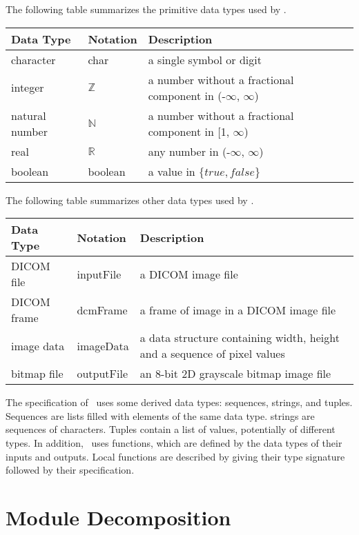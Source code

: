 \documentclass[12pt, titlepage]{article}
\begin{document}
The following table summarizes the primitive data types used by \progname. 

\begin{center}
\renewcommand{\arraystretch}{1.2}
\noindent 
\begin{tabular}{l l p{7.5cm}} 
\toprule 
\textbf{Data Type} & \textbf{Notation} & \textbf{Description}\\ 
\midrule
character & char & a single symbol or digit\\
integer & $\mathbb{Z}$ & a number without a fractional component in (-$\infty$,
$\infty$) \\
natural number & $\mathbb{N}$ & a number without a fractional component in [1,
$\infty$) \\
real & $\mathbb{R}$ & any number in (-$\infty$, $\infty$)\\
boolean & boolean & a value in $\{true, false\}$\\
\bottomrule
\end{tabular} 
\end{center}

The following table summarizes other data types used by \progname.
\begin{center}
\renewcommand{\arraystretch}{1.2}
\noindent 
\begin{tabular}{l l p{7.5cm}} 
\toprule 
\textbf{Data Type} & \textbf{Notation} & \textbf{Description}\\ 
\midrule
DICOM file & inputFile & a DICOM image file\\
DICOM frame & dcmFrame & a frame of image in a DICOM image file\\
image data & imageData & a data structure containing width, height and a
sequence of pixel values\\
bitmap file & outputFile & an 8-bit 2D grayscale bitmap image file\\
\bottomrule
\end{tabular} 
\end{center}

\noindent
The specification of \progname \ uses some derived data types: sequences,
strings, and
tuples. Sequences are lists filled with elements of the same data type. strings
are sequences of characters. Tuples contain a list of values, potentially of
different types. In addition, \progname \ uses functions, which
are defined by the data types of their inputs and outputs. Local functions are
described by giving their type signature followed by their specification.

\section{Module Decomposition}
\end{document}
